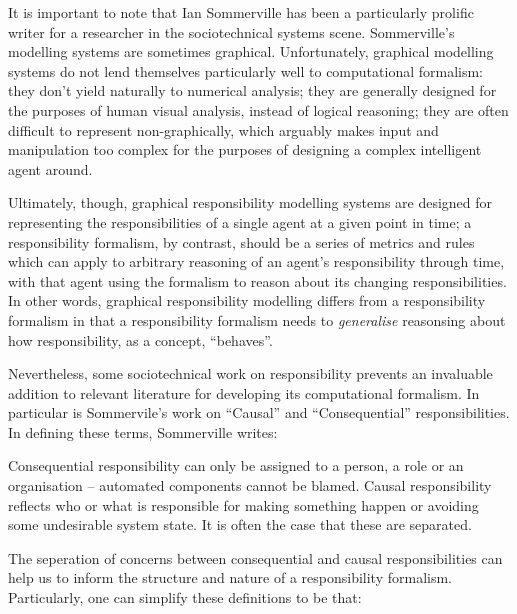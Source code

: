 It is important to note that Ian Sommerville has been a particularly prolific writer for a researcher in the sociotechnical systems scene. Sommerville's modelling systems are sometimes graphical\cite{sommerville_graphical_responsibility}. Unfortunately, graphical modelling systems do not lend themselves particularly well to computational formalism: they don't yield naturally to numerical analysis; they are generally designed for the purposes of human visual analysis, instead of logical reasoning; they are often difficult to represent non-graphically, which arguably makes input and manipulation too complex for the purposes of designing a complex intelligent agent around.\par

Ultimately, though, graphical responsibility modelling systems are designed for representing the responsibilities of a single agent at a given point in time; a responsibility formalism, by contrast, should be a series of metrics and rules which can apply to arbitrary reasoning of an agent's responsibility through time, with that agent using the formalism to reason about its changing responsibilities. In other words, graphical responsibility modelling differs from a responsibility formalism in that a responsibility formalism needs to \emph{generalise} reasonsing about how responsibility, as a concept, ``behaves''.

Nevertheless, some sociotechnical work on responsibility prevents an invaluable addition to relevant literature for developing its computational formalism. In particular is Sommervile's work on ``Causal'' and ``Consequential'' responsibilities. In defining these terms, Sommerville writes\cite{sommerville_dependable_systems_chap_8}:

\begin{displayquote}
    Consequential responsibility can only be assigned to a person, a role or an organisation – automated components cannot be blamed. Causal responsibility reflects who or what is responsible for making something happen or avoiding some undesirable system state. It is often the case that these are separated.
\end{displayquote}

The seperation of concerns between consequential and causal responsibilities can help us to inform the structure and nature of a responsibility formalism. Particularly, one can simplify these definitions to be that:

